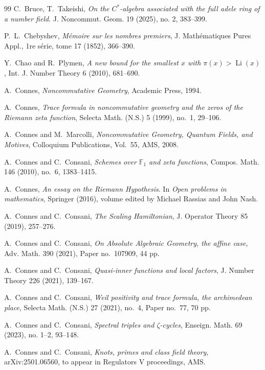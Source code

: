 \documentclass{article}
\begin{document}
\begin{thebibliography}{99}
 C.~Bruce, T.~Takeishi, 
\emph{On the $C^*$-algebra associated with the full adele ring of a number field}. 
J. Noncommut. Geom. 19 (2025), no. 2, 383--399.

P.~L.~Chebyshev,  
\emph{Mémoire sur les nombres premiers}, 
J. Mathématiques Pures Appl., 1re série, tome 17 (1852), 366--390.

Y.~Chao and R.~Plymen, 
\emph{A new bound for the smallest $x$ with $\pi(x) > \operatorname{Li}(x)$}, 
Int. J. Number Theory 6 (2010), 681--690.

A.~Connes, 
\emph{Noncommutative Geometry}, Academic Press, 1994.

A.~Connes, 
\emph{Trace formula in noncommutative geometry and the zeros of the Riemann zeta function}, 
Selecta Math. (N.S.) 5 (1999), no.~1, 29--106.

A.~Connes and M.~Marcolli, 
\emph{Noncommutative Geometry, Quantum Fields, and Motives}, 
Colloquium Publications, Vol.~55, AMS, 2008.


A.~Connes and C.~Consani, 
\emph{Schemes over $\mathbb{F}_1$ and zeta functions}, 
Compos. Math. 146 (2010), no.~6, 1383--1415.

 A.~Connes, \emph{An essay on the Riemann Hypothesis}. In \emph{Open problems in mathematics}, Springer (2016), volume edited by Michael Rassias and John Nash.

A.~Connes and C.~Consani, 
\emph{The Scaling Hamiltonian}, J. Operator Theory 85 (2019), 257--276.

A.~Connes and C.~Consani, 
\emph{On Absolute Algebraic Geometry, the affine case},  
Adv. Math. 390 (2021), Paper no.~107909, 44 pp.

A.~Connes and C.~Consani, 
\emph{Quasi-inner functions and local factors}, 
J. Number Theory 226 (2021), 139--167.

A.~Connes and C.~Consani, 
\emph{Weil positivity and trace formula, the archimedean place}, 
Selecta Math. (N.S.) 27 (2021), no.~4, Paper no.~77, 70 pp.

A.~Connes and C.~Consani, 
\emph{Spectral triples and $\zeta$-cycles}, 
Enseign. Math. 69 (2023), no. 1--2, 93--148.

A.~Connes and C.~Consani, 
\emph{Knots, primes and class field theory}, arXiv:2501.06560, to appear in Regulators V proceedings, AMS. 


\end{thebibliography}
\end{document}
